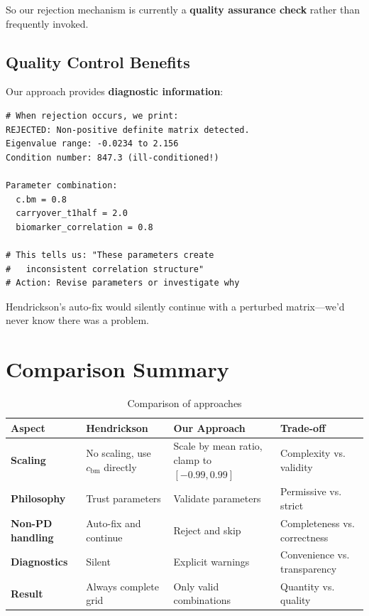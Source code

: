 \documentclass[11pt]{article}
\begin{document}
So our rejection mechanism is currently a \textbf{quality assurance check} rather than frequently invoked.

\subsection{Quality Control Benefits}

Our approach provides \textbf{diagnostic information}:

\begin{lstlisting}[style=Rstyle]
# When rejection occurs, we print:
REJECTED: Non-positive definite matrix detected.
Eigenvalue range: -0.0234 to 2.156
Condition number: 847.3 (ill-conditioned!)

Parameter combination:
  c.bm = 0.8
  carryover_t1half = 2.0
  biomarker_correlation = 0.8

# This tells us: "These parameters create
#   inconsistent correlation structure"
# Action: Revise parameters or investigate why
\end{lstlisting}

Hendrickson's auto-fix would silently continue with a perturbed matrix---we'd never know there was a problem.

\section{Comparison Summary}

\begin{table}[h]
\centering
\small
\begin{tabular}{p{2.5cm}p{3.5cm}p{3.5cm}p{3cm}}
\toprule
\textbf{Aspect} & \textbf{Hendrickson} & \textbf{Our Approach} & \textbf{Trade-off} \\
\midrule
\textbf{Scaling} & No scaling, use $c_{\text{bm}}$ directly & Scale by mean ratio, clamp to $[-0.99, 0.99]$ & Complexity vs. validity \\
\addlinespace
\textbf{Philosophy} & Trust parameters & Validate parameters & Permissive vs. strict \\
\addlinespace
\textbf{Non-PD handling} & Auto-fix and continue & Reject and skip & Completeness vs. correctness \\
\addlinespace
\textbf{Diagnostics} & Silent & Explicit warnings & Convenience vs. transparency \\
\addlinespace
\textbf{Result} & Always complete grid & Only valid combinations & Quantity vs. quality \\
\bottomrule
\end{tabular}
\caption{Comparison of approaches}
\end{table}
\end{document}
